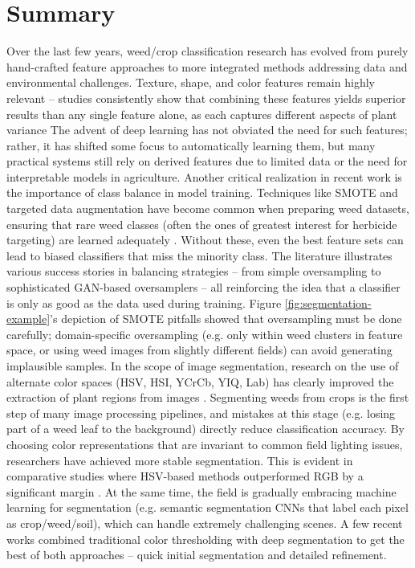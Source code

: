 \documentclass[letterpaper, notitlepage]{report}
\begin{document}
\section{Summary} 
Over the last few years, weed/crop classification research has evolved from purely hand-crafted feature approaches to more integrated methods addressing data and environmental challenges. Texture, shape, and color features remain highly relevant – studies consistently show that combining these features yields superior results than any single feature alone, as each captures different aspects of plant variance  The advent of deep learning has not obviated the need for such features; rather, it has shifted some focus to automatically learning them, but many practical systems still rely on derived features due to limited data or the need for interpretable models in agriculture.  
%
Another critical realization in recent work is the importance of class balance in model training. Techniques like SMOTE and targeted data augmentation have become common when preparing weed datasets, ensuring that rare weed classes (often the ones of greatest interest for herbicide targeting) are learned adequately \parencite{Ahsen2024-tr, Bazrafkan2024-bl}. Without these, even the best feature sets can lead to biased classifiers that miss the minority class. The literature illustrates various success stories in balancing strategies – from simple oversampling to sophisticated GAN-based oversamplers – all reinforcing the idea that a classifier is only as good as the data used during training. Figure  \ref{fig:segmentation-example}’s depiction of SMOTE pitfalls showed that oversampling must be done carefully; domain-specific oversampling (e.g. only within weed clusters in feature space, or using weed images from slightly different fields) can avoid generating implausible samples.  
%
In the scope of image segmentation, research on  the use of alternate color spaces (HSV, HSI, YCrCb, YIQ, Lab) has clearly improved the extraction of plant regions from images  \parencite{Wu2021-gt}. Segmenting weeds from crops is the first step of many image processing pipelines, and mistakes at this stage (e.g. losing part of a weed leaf to the background) directly reduce classification accuracy. By choosing color representations that are invariant to common field lighting issues, researchers have achieved more stable segmentation. This is evident in comparative studies where HSV-based methods outperformed RGB by a significant margin \parencite{Priya2019-zw}. At the same time, the field is gradually embracing machine learning for segmentation (e.g. semantic segmentation CNNs that label each pixel as crop/weed/soil), which can handle extremely challenging scenes. A few recent works combined traditional color thresholding with deep segmentation to get the best of both approaches – quick initial segmentation and detailed refinement.  
\end{document}
